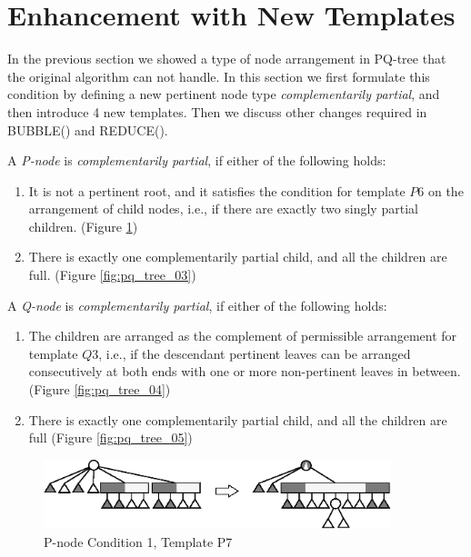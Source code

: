 \documentclass[a4]{jgaa-art}
\newenvironment{definition}[1][Definition]{\begin{trivlist}
\item[\hskip \labelsep {\bfseries #1}]}{\end{trivlist}}
\begin{document}
\section{Enhancement with New Templates}\label{se:correction}
In the previous section we showed a type of node arrangement in PQ-tree that
the original algorithm can not handle.
In this section we first formulate this condition by defining a new
pertinent node type {\it complementarily partial}, and then
introduce 4 new templates.
Then we discuss other changes required in BUBBLE() and REDUCE().

\begin{definition}
A \emph{P-node} is \emph{complementarily partial}, if either of the following
holds:
\begin{enumerate}
\item \label{item:P2}It is not a pertinent root, and it satisfies the
condition for template $P6$ on the arrangement of child nodes,
i.e., if there are exactly two singly partial children. (Figure \ref{fig:pq_tree_02})
\item \label{item:P1}There is exactly one complementarily partial child, and all the
 children are full. (Figure \ref{fig:pq_tree_03})
\end{enumerate}
\end{definition}

\begin{definition}
A \emph{Q-node} is \emph{complementarily partial}, if either of the following
holds:
\begin{enumerate}
\item \label{item:Q2}The children are arranged as the complement of permissible arrangement
   for template $Q3$, i.e., if the descendant pertinent leaves can be arranged 
   consecutively at both ends with one or more non-pertinent leaves in between.
 (Figure \ref{fig:pq_tree_04})
\item \label{item:Q1}There is exactly one complementarily partial child, and all the children
   are full
 (Figure \ref{fig:pq_tree_05})
\end{enumerate}
\end{definition}

\begin{figure}[!htb]
  \centering
  \includegraphics[width=0.9\textwidth]{pq_tree_sample_02}
  \caption{P-node Condition 1, Template P7}
  \label{fig:pq_tree_02}
\end{figure}
\end{document}
